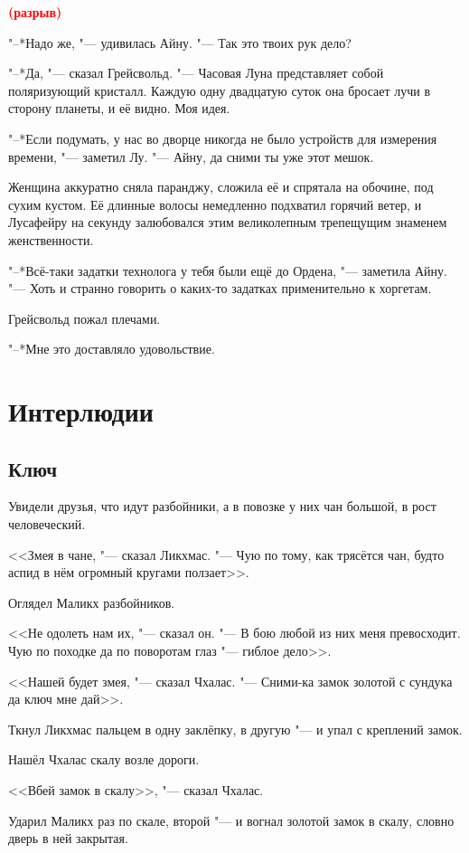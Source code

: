 \documentclass[a4paper,10pt]{book}
\newcommand{\spacing}{\textcolor{red}{\textbf{(разрыв)}}}
\begin{document}
\spacing

"--*Надо же, "--- удивилась Айну. "--- Так это твоих рук дело?

"--*Да, "--- сказал Грейсвольд. "--- Часовая Луна представляет собой 
поляризующий кристалл. Каждую одну двадцатую суток она бросает лучи в сторону 
планеты, и её видно. Моя идея.

"--*Если подумать, у нас во дворце никогда не было устройств для измерения 
времени, "--- заметил Лу. "--- Айну, да сними ты уже этот мешок.

Женщина аккуратно сняла паранджу, сложила её и спрятала на обочине, под сухим 
кустом. Её длинные волосы немедленно подхватил горячий ветер, и Лусафейру на 
секунду залюбовался этим великолепным трепещущим знаменем женственности.

"--*Всё-таки задатки технолога у тебя были ещё до Ордена, "--- заметила Айну. 
"--- Хоть и странно говорить о каких-то задатках применительно к хоргетам.

Грейсвольд пожал плечами.

"--*Мне это доставляло удовольствие.

\chapter{Интерлюдии}

\section{Ключ}

Увидели друзья, что идут разбойники, а в повозке у них чан большой, в рост человеческий.

<<Змея в чане, "--- сказал Ликхмас. "--- Чую по тому, как трясётся чан, будто аспид в нём огромный кругами ползает>>.

Оглядел Маликх разбойников.

<<Не одолеть нам их, "--- сказал он. "--- В бою любой из них меня превосходит. Чую по походке да по поворотам глаз "--- гиблое дело>>.

<<Нашей будет змея, "--- сказал Чхалас. "--- Сними-ка замок золотой с сундука да ключ мне дай>>.

Ткнул Ликхмас пальцем в одну заклёпку, в другую "--- и упал с креплений замок.

Нашёл Чхалас скалу возле дороги.

<<Вбей замок в скалу>>, "--- сказал Чхалас.

Ударил Маликх раз по скале, второй "--- и вогнал золотой замок в скалу, словно дверь в ней закрытая.
\end{document}
